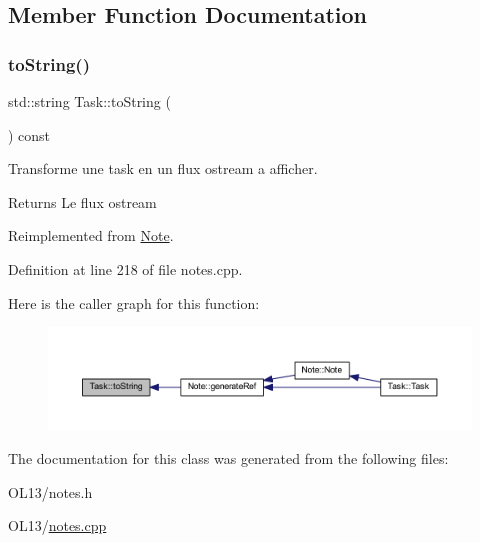 \subsection{Member Function Documentation}
\mbox{\label{class_task_a7fe5cb7b57a21693e7abfea2f9618563}} 
\subsubsection{\texorpdfstring{to\+String()}{toString()}}
{\footnotesize\ttfamily std\+::string Task\+::to\+String (\begin{DoxyParamCaption}{ }\end{DoxyParamCaption}) const\hspace{0.3cm}{\ttfamily [virtual]}}



Transforme une task en un flux ostream a afficher. 

\begin{DoxyReturn}{Returns}
Le flux ostream 
\end{DoxyReturn}


Reimplemented from \hyperlink{class_note_a1bd4acfbde0b71d05fd7d4ca889bca2b}{Note}.



Definition at line 218 of file notes.\+cpp.

Here is the caller graph for this function\+:\nopagebreak
\begin{figure}[H]
\begin{center}
\leavevmode
\includegraphics[width=350pt]{class_task_a7fe5cb7b57a21693e7abfea2f9618563_icgraph}
\end{center}
\end{figure}


The documentation for this class was generated from the following files\+:\begin{DoxyCompactItemize}
\item 
O\+L13/notes.\+h\item 
O\+L13/\hyperlink{notes_8cpp}{notes.\+cpp}\end{DoxyCompactItemize}
